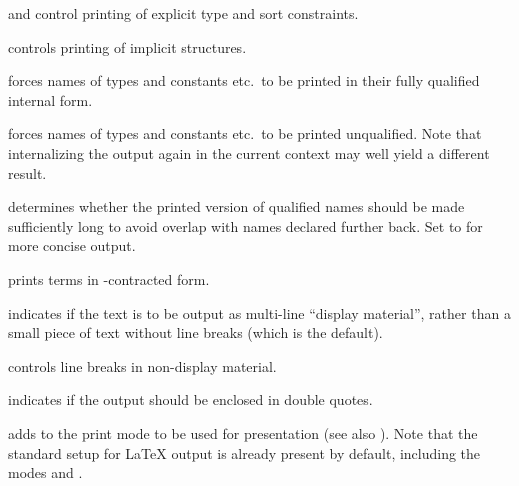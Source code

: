 \begin{isabellebody}
\begin{isamarkuptext}
  \begin{descr}

  \item[\isa{show{\isacharunderscore}types\ {\isacharequal}\ bool} and \isa{show{\isacharunderscore}sorts\ {\isacharequal}\ bool}]
  control printing of explicit type and sort constraints.

  \item[\isa{show{\isacharunderscore}structs\ {\isacharequal}\ bool}] controls printing of implicit
  structures.

  \item[\isa{long{\isacharunderscore}names\ {\isacharequal}\ bool}] forces names of types and
  constants etc.\ to be printed in their fully qualified internal
  form.

  \item[\isa{short{\isacharunderscore}names\ {\isacharequal}\ bool}] forces names of types and
  constants etc.\ to be printed unqualified.  Note that internalizing
  the output again in the current context may well yield a different
  result.

  \item[\isa{unique{\isacharunderscore}names\ {\isacharequal}\ bool}] determines whether the printed
  version of qualified names should be made sufficiently long to avoid
  overlap with names declared further back.  Set to  for
  more concise output.

  \item[\isa{eta{\isacharunderscore}contract\ {\isacharequal}\ bool}] prints terms in \isa{{\isasymeta}}-contracted form.

  \item[\isa{display\ {\isacharequal}\ bool}] indicates if the text is to be
  output as multi-line ``display material'', rather than a small piece
  of text without line breaks (which is the default).

  \item[\isa{break\ {\isacharequal}\ bool}] controls line breaks in non-display
  material.

  \item[\isa{quotes\ {\isacharequal}\ bool}] indicates if the output should be
  enclosed in double quotes.

  \item[\isa{mode\ {\isacharequal}\ name}] adds  to the print mode to
  be used for presentation (see also \cite{isabelle-ref}).  Note that
  the standard setup for {\LaTeX} output is already present by
  default, including the modes  and .


\end{descr}
\end{isamarkuptext}
\end{isabellebody}
